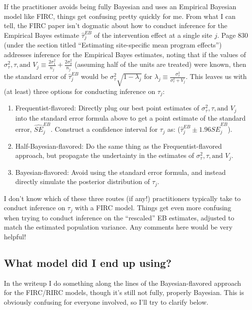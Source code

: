 \documentclass[]{article}
\begin{document}
If the practitioner avoids being fully Bayesian and uses an Empirical Bayesian model like FIRC, things get confusing pretty quickly for me.
From what I can tell, the FIRC paper isn't dogmatic about how to conduct inference for the Empirical Bayes estimate $\hat{\tau}_j^{EB}$ of the intervention effect at a single site $j$.
Page 830 (under the section titled ``Estimating site-specific mean program effects'') addresses inference for the Empirical Bayes estimates, noting that if the values of $\sigma^2_\tau, \tau, \text{and } V_j \equiv \frac{2\sigma^2_1}{n_j} + \frac{2\sigma^2_0}{n_j}$ (assuming half of the units are treated) were known, then the standard error of $\hat{\tau}_j^{EB}$ would be $\sigma^2_\tau \sqrt{1-\lambda_j}$ for $\lambda_j \equiv \frac{\sigma^2_\tau}{\sigma^2_\tau + V_j}$.
This leaves us with (at least) three options for conducting inference on $\tau_j$:
\begin{enumerate}
	\item Frequentist-flavored: Directly plug our best point estimates of $\sigma^2_\tau, \tau, \text{and } V_j$ into the standard error formula above to get a point estimate of the standard error, $\hat{SE}^{EB}_j$.
	Construct a confidence interval for $\tau_j$ as: ($\hat{\tau}_j^{EB} \pm 1.96 \hat{SE}^{EB}_j$).
	\item Half-Bayesian-flavored: Do the same thing as the Frequentist-flavored approach, but propagate the undertainty in the estimates of $\sigma^2_\tau, \tau, \text{and } V_j$.
	\item Bayesian-flavored: Avoid using the standard error formula, and instead directly simulate the posterior distribution of $\tau_j$.
\end{enumerate}

I don't know which of these three routes (if any!) practitioners typically take to conduct inference on $\tau_j$ with a FIRC model.
Things get even more confusing when trying to conduct inference on the ``rescaled'' EB estimates, adjusted to match the estimated population variance.
Any comments here would be very helpful!

\subsection{What model did I end up using?}

In the writeup I do something along the lines of the Bayesian-flavored approach for the FIRC/RIRC models, though it's still not fully, properly Bayesian.
This is obviously confusing for everyone involved, so I'll try to clarify below.
\end{document}

